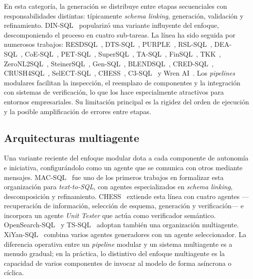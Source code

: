 En esta categoría, la generación se distribuye entre etapas secuenciales
con responsabilidades distintas: típicamente \emph{schema linking},
generación, validación y refinamiento. DIN-SQL~\cite{DIN-SQL2023} popularizó
una variante influyente del enfoque, descomponiendo el proceso en cuatro
sub-tareas. La línea ha sido seguida por numerosos trabajos:
RESDSQL~\cite{RESDSQL2023}, DTS-SQL~\cite{DTS-SQL2024},
PURPLE~\cite{PURPLE2024}, RSL-SQL~\cite{RSL-SQL2024},
DEA-SQL~\cite{DEA-SQL2024}, CoE-SQL~\cite{CoE-SQL2024},
PET-SQL~\cite{PET-SQL2024}, SuperSQL~\cite{SuperSQL2024},
TA-SQL~\cite{TA-SQL2024}, FinSQL~\cite{FinSQL2024},
TKK~\cite{TKK2022}, ZeroNL2SQL~\cite{ZeroNL2SQL2024},
SteinerSQL~\cite{SteinerSQL2025}, Gen-SQL~\cite{Gen-SQL2025},
BLENDSQL~\cite{BLENDSQL2025}, CRED-SQL~\cite{CRED-SQL2025},
CRUSH4SQL~\cite{CRUSH4SQL2023}, SelECT-SQL~\cite{SC-Prompt2023},
CHESS~\cite{CHESS2024}, C3-SQL~\cite{C3-SQL2023} y
Wren AI~\cite{WrenAI2025}. Los \emph{pipelines} modulares facilitan la
inspección, el reemplazo de componentes y la integración con sistemas de
verificación, lo que los hace especialmente atractivos para entornos
empresariales. Su limitación principal es la rigidez del orden de
ejecución y la posible amplificación de errores entre etapas.

\subsection{Arquitecturas multiagente}
\label{subsec:sota-d2-multiagente}

Una variante reciente del enfoque modular dota a cada componente de
autonomía e iniciativa, configurándolo como un agente que se comunica con
otros mediante mensajes. MAC-SQL~\cite{MAC-SQL2023} fue uno de los
primeros trabajos en formalizar esta organización para \emph{text-to-SQL},
con agentes especializados en \emph{schema linking}, descomposición y
refinamiento. CHESS~\cite{CHESS2024} extiende esta línea con cuatro
agentes ---recuperación de información, selección de esquema, generación
y verificación--- e incorpora un agente \emph{Unit Tester} que actúa como
verificador semántico. OpenSearch-SQL~\cite{OpenSearch-SQL2025} y
TS-SQL~\cite{TS-SQL2025} adoptan también una organización multiagente.
XiYan-SQL~\cite{XiYan-SQL2024} combina varios agentes generadores con un
agente seleccionador. La diferencia operativa entre un \emph{pipeline}
modular y un sistema multiagente es a menudo gradual; en la práctica, lo
distintivo del enfoque multiagente es la capacidad de varios componentes
de invocar al modelo de forma asíncrona o cíclica.

